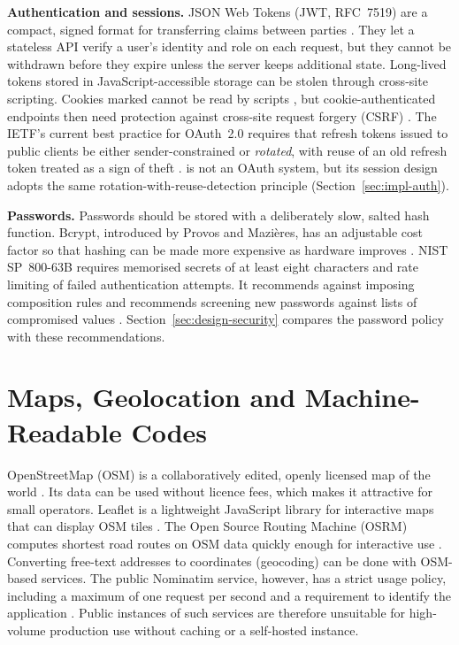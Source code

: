 \textbf{Authentication and sessions.} JSON Web Tokens (JWT, RFC~7519) are a compact, signed format for transferring claims between parties \cite{rfc7519}. They let a stateless API verify a user's identity and role on each request, but they cannot be withdrawn before they expire unless the server keeps additional state. Long-lived tokens stored in JavaScript-accessible storage can be stolen through cross-site scripting. Cookies marked  cannot be read by scripts \cite{rfc6265}, but cookie-authenticated endpoints then need protection against cross-site request forgery (CSRF) \cite{owaspcsrf}. The IETF's current best practice for OAuth~2.0 requires that refresh tokens issued to public clients be either sender-constrained or \emph{rotated}, with reuse of an old refresh token treated as a sign of theft \cite{rfc9700}. \scpms{} is not an OAuth system, but its session design adopts the same rotation-with-reuse-detection principle (Section~\ref{sec:impl-auth}).

\textbf{Passwords.} Passwords should be stored with a deliberately slow, salted hash function. Bcrypt, introduced by Provos and Mazi\`eres, has an adjustable cost factor so that hashing can be made more expensive as hardware improves \cite{provos1999bcrypt}. NIST SP~800-63B requires memorised secrets of at least eight characters and rate limiting of failed authentication attempts. It recommends against imposing composition rules and recommends screening new passwords against lists of compromised values \cite{nist80063b}. Section~\ref{sec:design-security} compares the \scpms{} password policy with these recommendations.

\section{Maps, Geolocation and Machine-Readable Codes}
\label{sec:lit-maps}

OpenStreetMap (OSM) is a collaboratively edited, openly licensed map of the world \cite{haklay2008osm}. Its data can be used without licence fees, which makes it attractive for small operators. Leaflet is a lightweight JavaScript library for interactive maps that can display OSM tiles \cite{leafletdocs}. The Open Source Routing Machine (OSRM) computes shortest road routes on OSM data quickly enough for interactive use \cite{luxen2011osrm}. Converting free-text addresses to coordinates (geocoding) can be done with OSM-based services. The public Nominatim service, however, has a strict usage policy, including a maximum of one request per second and a requirement to identify the application \cite{nominatimpolicy}. Public instances of such services are therefore unsuitable for high-volume production use without caching or a self-hosted instance.


